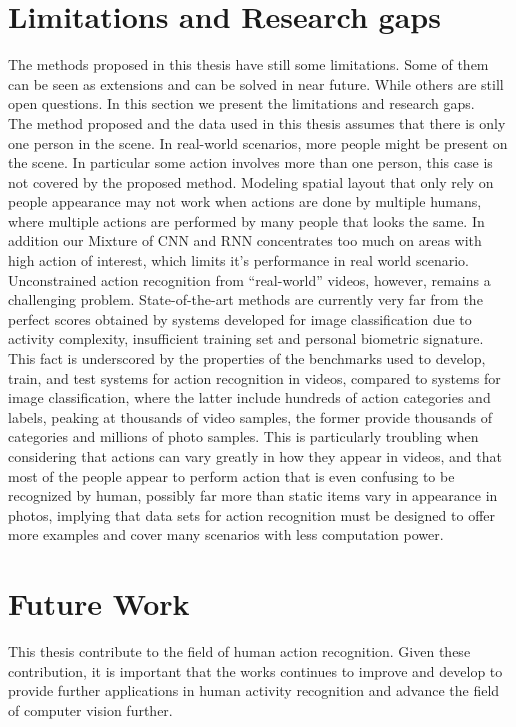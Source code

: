 \section{Limitations and Research gaps}
The methods proposed in this thesis have still some limitations. Some of them can be seen
as extensions and can be solved in near future. While others are still open questions. In this section we present the limitations and research gaps.\\

The method proposed and the data used in this thesis assumes that there is only one person in the scene. In real-world scenarios, more people might be present on the scene. In particular some action involves more than one person,  this case is not covered by the proposed method. Modeling spatial layout that only rely on people appearance may not work when actions are done by multiple humans, where multiple actions are performed by many people that looks the same. In addition our Mixture of CNN and RNN concentrates too much on areas with high action of interest, which limits it’s performance in real world scenario.\\

Unconstrained action recognition from “real-world” videos,
however, remains a challenging problem. State-of-the-art
methods are currently very far from the perfect scores obtained by systems developed for image classification due to activity complexity, insufficient training set and personal biometric signature. This fact is underscored by the properties of the benchmarks
used to develop, train, and test systems for action recognition in videos, compared to systems for image classification, where the latter include hundreds of action categories and labels,
peaking at thousands of video samples, the former provide
thousands of categories and millions of photo samples. This
is particularly troubling when considering that actions can
vary greatly in how they appear in videos, and that most of the people appear to perform action that is even confusing to be recognized by human, possibly far more
than static items vary in appearance in photos, implying that
data sets for action recognition must be designed to offer
more examples and cover many scenarios with less computation power.

\section{Future Work}
This thesis contribute to the field of human action recognition. Given these contribution, it is important that the works continues to improve and develop to provide further applications in human activity recognition and advance the field of computer vision further.\\

